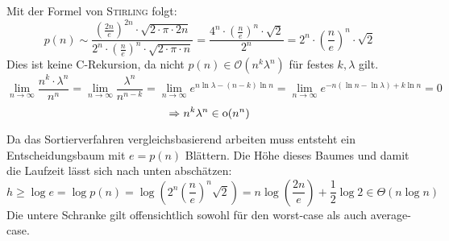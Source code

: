\begin{flushenum}
\item
	Mit der Formel von \textsc{Stirling} folgt:
	\[ p(n) \sim \frac{\left(\frac{2n}{e}\right)^{2n} \cdot \sqrt{2 \cdot \pi \cdot 2n}}{2^n \cdot \left(\frac{n}{e}\right)^n \cdot \sqrt{2 \cdot \pi \cdot n}} =
	   \frac{4^n \cdot \left(\frac{n}{e}\right)^n \cdot \sqrt{2}}{2^n} = 2^n \cdot \left(\frac{n}{e}\right)^n \cdot \sqrt{2} \]
	Dies ist keine C-Rekursion, da nicht $p(n) \in \mathcal{O}(n^k \lambda^n)$ für festes $k, \lambda$ gilt.
	\newcommand{\limninf}{\underset{n\rightarrow \infty}{\lim}}
	\[  \limninf \frac{n^k \cdot \lambda^n}{n^n} = \limninf \frac{\lambda^n}{n^{n-k}} = \limninf e^{n \ln \lambda - (n-k) \ln n} =
	    \limninf e^{-n(\ln n - \ln \lambda) + k \ln n} = 0 \]
	\[ \Rightarrow n^k \lambda^n \in \hbox{o}(n^n) \]

\item
	Da das Sortierverfahren vergleichsbasierend arbeiten muss entsteht ein Entscheidungsbaum mit $e = p(n)$ Blättern.
	Die Höhe dieses Baumes und damit die Laufzeit lässt sich nach unten abschätzen:
	\[h \geq \log e = \log p(n) = \log \left( 2^n \left(\frac{n}{e}\right)^n \sqrt{2}\right) = 
	 n \log \left( \frac{2n}{e}\right) + \frac{1}{2} \log 2 \in \Theta(n \log n)\]
	Die untere Schranke gilt offensichtlich sowohl für den worst-case als auch average-case.
\end{flushenum}
